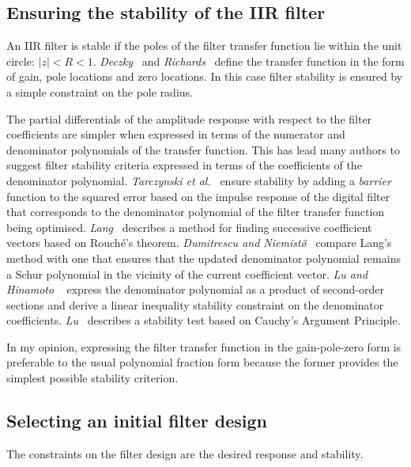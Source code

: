 \documentclass[a4paper,twoside,10pt,english]{report}
\begin{document}
\subsection{Ensuring the stability of the IIR filter}
An IIR filter is stable if the poles of the filter transfer function lie within
the unit circle: $\left| z \right| < R < 1$. 
\emph{Deczky}~\cite{Deczky_MinPSynthesisIIRDigitalFilters} and 
\emph{Richards}~\cite{Richards_DeczkyRecursiveDecimator} define the transfer 
function in the form of gain, pole locations and zero locations. In this case
filter stability is ensured by a simple constraint on the pole radius.

The partial differentials of the amplitude response with respect to the filter
coefficients are simpler when expressed in terms of the numerator and 
denominator polynomials of the transfer function. This has lead many authors to
suggest filter stability criteria expressed in terms of the coefficients of the
denominator polynomial. 
\emph{Tarczynski et al.}~\cite{TarczynskiCainHermanowiczRojewski_WISEMethodDesignIIRFilters} 
ensure stability by adding a \emph{barrier} function to the squared error based
on the impulse response of the digital filter that corresponds to the denominator
polynomial of the filter transfer function being optimised. \emph{Lang}~
\cite{Lang_LSDesignIIRDigitalFiltersPoleRadiusConstraint} describes a method
for finding successive coefficient vectors based on Rouch\'{e}'s theorem.
\emph{Dumitrescu and Niemist\"\o}~
\cite{DumitrescuNiemisto_IIRFilterPositiveRealness} compare Lang's
method with one that ensures that the updated denominator polynomial remains
a Schur polynomial in the vicinity of the current coefficient vector.
\emph{Lu and Hinamoto} 
~\cite{LuHinamoto_IIRFrequencyMaskingFiltersConeProgramming} express the
denominator polynomial as a product of second-order sections and derive a
linear inequality stability constraint on the denominator coefficients.
\emph{Lu}~\cite{Lu_ArgumentPrincipleIIRFilterStability} describes a 
stability test based on Cauchy's Argument Principle.

In my opinion, expressing the filter transfer function in the gain-pole-zero
form is preferable to the usual polynomial fraction form because the former
provides the simplest possible stability criterion. 
\subsection{\label{sub:Selecting-an-initial-filter-design}Selecting an initial filter design}
The constraints on the filter design are the desired response and stability.
\end{document}
